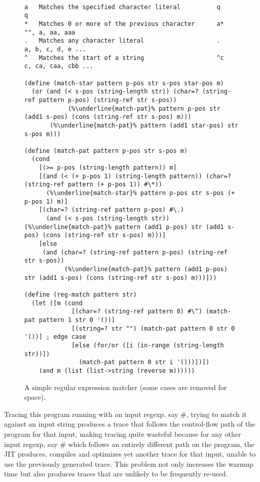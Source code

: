 \begin{figure}[h!]
\footnotesize
\begin{lstlisting}[mathescape,escapechar=\%]

a 	Matches the specified character literal          q       q
* 	Matches 0 or more of the previous character      a*      "", a, aa, aaa
. 	Matches any character literal                    .       a, b, c, d, e ...
^ 	Matches the start of a string                    ^c      c, ca, caa, cbb ...

(define (match-star pattern p-pos str s-pos star-pos m)
  (or (and (< s-pos (string-length str)) (char=? (string-ref pattern p-pos) (string-ref str s-pos))
            (%\underline{match-pat}% pattern p-pos str (add1 s-pos) (cons (string-ref str s-pos) m)))
       (%\underline{match-pat}% pattern (add1 star-pos) str s-pos m)))

(define (match-pat pattern p-pos str s-pos m)
  (cond
    [(>= p-pos (string-length pattern)) m]
    [(and (< (+ p-pos 1) (string-length pattern)) (char=? (string-ref pattern (+ p-pos 1)) #\*))
      (%\underline{match-star}% pattern p-pos str s-pos (+ p-pos 1) m)]
    [(char=? (string-ref pattern p-pos) #\.)
      (and (< s-pos (string-length str)) (%\underline{match-pat}% pattern (add1 p-pos) str (add1 s-pos) (cons (string-ref str s-pos) m)))]
    [else
     (and (char=? (string-ref pattern p-pos) (string-ref str s-pos))
           (%\underline{match-pat}% pattern (add1 p-pos) str (add1 s-pos) (cons (string-ref str s-pos) m)))]))

(define (reg-match pattern str)
  (let ([m (cond
             [(char=? (string-ref pattern 0) #\^) (match-pat pattern 1 str 0 '())]
             [(string=? str "") (match-pat pattern 0 str 0 '())] ; edge case
             [else (for/or ([i (in-range (string-length str))])
               (match-pat pattern 0 str i '()))])])
    (and m (list (list->string (reverse m))))))
\end{lstlisting}
\caption{A simple regular expression matcher (some cases are removed for space).}
\label{fig:regexp}
\end{figure}

Tracing this program running with an input regexp, say
$\mathtt{\#}$, trying to match it against an
input string produces a trace that follows the control-flow path of
the program for that input, making tracing quite wasteful because for
any other input regexp, say $\mathtt{\#}$ which
follows an entirely different path on the program, the JIT produces,
compiles and optimizes yet another trace for that input, unable to use
the previously generated trace. This problem not only increases the
warmup time but also produces traces that are unlikely to be
frequently re-used.

